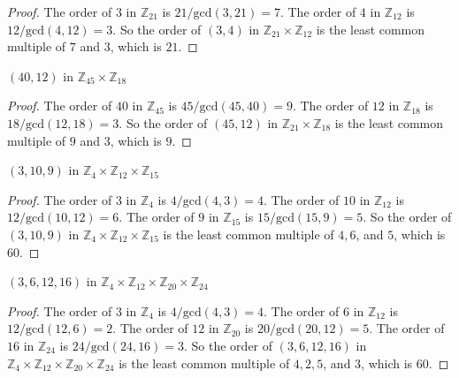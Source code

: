 \begin{proof}
    The order of $3$ in $\mathbb{Z}_{21}$ is $21/\text{gcd}(3,21) = 7$. The order of $4$ in $\mathbb{Z}_{12}$ is $12/\text{gcd}(4,12) = 3$. So the order of $(3,4)$ in $\mathbb{Z}_{21}\times\mathbb{Z}_{12}$ is the least common multiple of $7$ and $3$, which is $21$.
\end{proof}

\newpage
\begin{exercise}
    $(40,12)$ in $\mathbb{Z}_{45}\times\mathbb{Z}_{18}$
\end{exercise}

\begin{proof}
    The order of $40$ in $\mathbb{Z}_{45}$ is $45/\text{gcd}(45,40) = 9$. The order of $12$ in $\mathbb{Z}_{18}$ is $18/\text{gcd}(12,18) = 3$. So the order of $(45,12)$ in $\mathbb{Z}_{21}\times\mathbb{Z}_{18}$ is the least common multiple of $9$ and $3$, which is $9$.
\end{proof}

\newpage
\begin{exercise}
    $(3,10,9)$ in $\mathbb{Z}_{4}\times\mathbb{Z}_{12}\times\mathbb{Z}_{15}$
\end{exercise}

\begin{proof}
    The order of $3$ in $\mathbb{Z}_{4}$ is $4/\text{gcd}(4,3) = 4$. The order of $10$ in $\mathbb{Z}_{12}$ is $12/\text{gcd}(10,12) = 6$. The order of $9$ in $\mathbb{Z}_{15}$ is $15/\text{gcd}(15,9) = 5$. So the order of $(3,10,9)$ in $\mathbb{Z}_{4}\times\mathbb{Z}_{12}\times\mathbb{Z}_{15}$ is the least common multiple of $4, 6$, and $5$, which is $60$.
\end{proof}

\newpage
\begin{exercise}
    $(3,6,12,16)$ in $\mathbb{Z}_{4}\times\mathbb{Z}_{12}\times\mathbb{Z}_{20}\times\mathbb{Z}_{24}$
\end{exercise}

\begin{proof}
    The order of $3$ in $\mathbb{Z}_{4}$ is $4/\text{gcd}(4,3) = 4$. The order of $6$ in $\mathbb{Z}_{12}$ is $12/\text{gcd}(12,6) = 2$. The order of $12$ in $\mathbb{Z}_{20}$ is $20/\text{gcd}(20,12) = 5$. The order of $16$ in $\mathbb{Z}_{24}$ is $24/\text{gcd}(24,16) = 3$. So the order of $(3,6,12,16)$ in $\mathbb{Z}_{4}\times\mathbb{Z}_{12}\times\mathbb{Z}_{20}\times\mathbb{Z}_{24}$ is the least common multiple of $4, 2, 5$, and $3$, which is $60$.
\end{proof}

